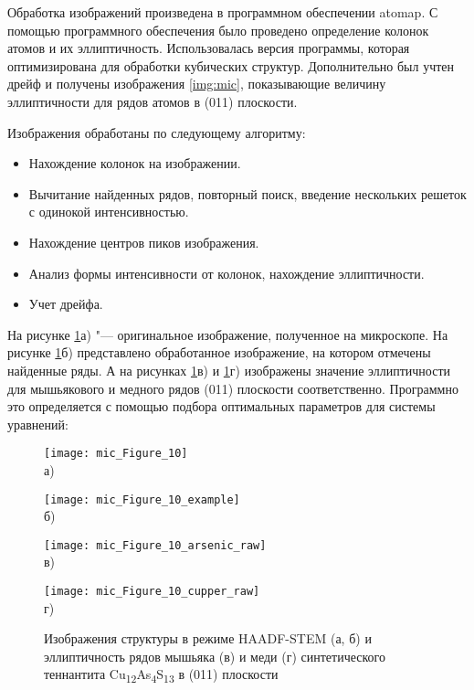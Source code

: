 Обработка изображений произведена в программном обеспечении atomap\cite{Nord2017}. С помощью программного обеспечения было проведено определение колонок атомов и их эллиптичность. Использовалась версия программы, которая оптимизирована для обработки кубических структур. Дополнительно был учтен дрейф и получены изображения \ref{img:mic}, показывающие величину эллиптичности для рядов атомов в (011) плоскости.

Изображения обработаны по следующему алгоритму:
\begin{itemize}
\item Нахождение колонок на изображении.

\item Вычитание найденных рядов, повторный поиск, введение нескольких решеток с одинокой интенсивностью.

\item Нахождение центров пиков изображения.

\item Анализ формы интенсивности от колонок, нахождение эллиптичности.

\item Учет дрейфа.
\end{itemize}

На рисунке \ref{img:mic1}а) "--- оригинальное изображение, полученное на микроскопе. На рисунке \ref{img:mic1}б) представлено обработанное изображение, на котором отмечены найденные ряды. А на рисунках \ref{img:mic1}в) и \ref{img:mic1}г) изображены значение эллиптичности для  мышьякового и медного рядов (011) плоскости соответственно.
Программно это определяется с помощью подбора оптимальных параметров для системы уравнений:
\begin{figure}[p!]
  \begin{minipage}[ht]{0.5\linewidth}\centering
    \texttt{[image: mic\_Figure\_10]} \\ а)
  \end{minipage}
  \hfill
  \begin{minipage}[ht]{0.5\linewidth}\centering
    \texttt{[image: mic\_Figure\_10\_example]} \\ б)
  \end{minipage}
\vfill
  \begin{minipage}[ht]{0.5\linewidth}\centering
    \texttt{[image: mic\_Figure\_10\_arsenic\_raw]} \\ в)
  \end{minipage}
  \hfill
  \begin{minipage}[ht]{0.5\linewidth}\centering
    \texttt{[image: mic\_Figure\_10\_cupper\_raw]} \\ г)
  \end{minipage}

      \caption[Изображения структуры в режиме HAADF-STEM (а, б) и эллиптичность рядов мышьяка (в) и меди (г) синтетического теннантита Cu\textsubscript{12}As\textsubscript{4}S\textsubscript{13} в (011) плоскости]{Изображения структуры в режиме HAADF-STEM (а, б) и эллиптичность рядов мышьяка (в) и меди (г) синтетического теннантита Cu\textsubscript{12}As\textsubscript{4}S\textsubscript{13} в  (011) плоскости}
    \label{img:mic1}
\end{figure}


